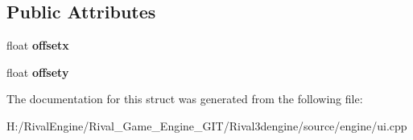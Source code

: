 \subsection*{Public Attributes}
\begin{DoxyCompactItemize}
\item 
\mbox{\label{struct_u_i_1_1_offsetter_ad34d9fa3b58fdb60be41750fb6857de6}} 
float {\bfseries offsetx}
\item 
\mbox{\label{struct_u_i_1_1_offsetter_aeefee9c30cdca649485386df20924129}} 
float {\bfseries offsety}
\end{DoxyCompactItemize}


The documentation for this struct was generated from the following file\+:\begin{DoxyCompactItemize}
\item 
H\+:/\+Rival\+Engine/\+Rival\+\_\+\+Game\+\_\+\+Engine\+\_\+\+G\+I\+T/\+Rival3dengine/source/engine/ui.\+cpp\end{DoxyCompactItemize}
